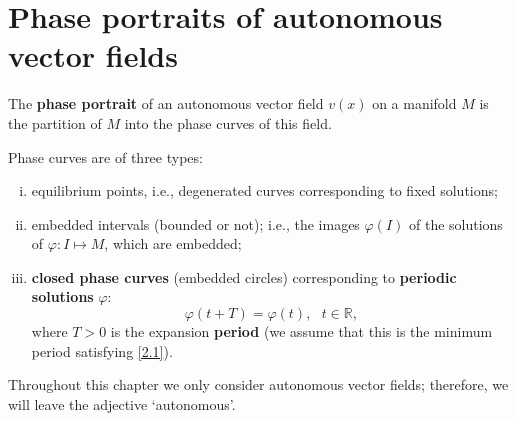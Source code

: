 \chapter{Phase portraits of autonomous vector fields}

\begin{definition}\label{def:2.1}
	The \textbf{phase portrait} of an autonomous vector field $ v (x) $ on a manifold $ M $ is the partition of $ M $ into the phase curves of this field.
\end{definition}

Phase curves are of three types:
\begin{enumerate}[(i)]
	\item equilibrium points, i.e., degenerated curves corresponding to fixed solutions;
	\item embedded intervals (bounded or not); i.e., the images $\varphi(I)$ of the solutions of $\varphi :I\longmapsto M$, which are embedded;
	\item \textbf{closed phase curves} (embedded circles) corresponding to \textbf{periodic solutions} $\varphi :$
	\begin{equation}
	\label{2.1}
	\varphi (t+T)=\varphi (t),\text{ \ \ }t\in \mathbb{R},
	\end{equation}
	where $ T> 0 $ is the expansion \textbf{period} (we assume that this is the minimum period satisfying \eqref{2.1}).
\end{enumerate}

Throughout this chapter we only consider autonomous vector fields; therefore, we will leave the adjective `autonomous'.

